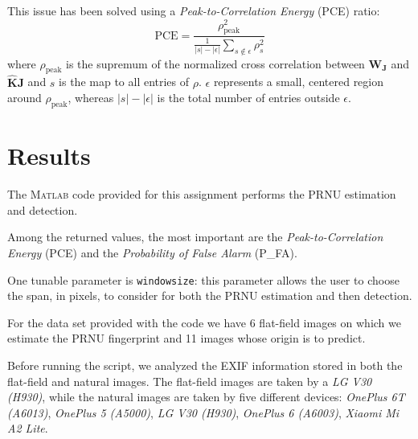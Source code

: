 \documentclass[a4paper, 11pt]{article}
\begin{document}
This issue has been solved using a \textit{Peak-to-Correlation Energy} (PCE) ratio:
\begin{equation}
\text{PCE} = \dfrac{{\rho}^2_{\text{peak}}}{\frac{1}{|s|-|\epsilon|} \sum\limits_{s\notin \epsilon} {\rho}^2_s}
\end{equation}
where ${\rho}_{\text{peak}}$ is the supremum of the normalized cross correlation between $\mathbf{W_J}$ and $\mathbf{\hat{K}J}$ and $s$ is the map to all entries of $\rho$. $\epsilon$ represents a small, centered region around ${\rho}_{\text{peak}}$, whereas $|s|-|\epsilon|$ is the total number of entries outside $\epsilon$.

\section*{Results}
The \textsc{Matlab} code provided for this assignment performs the PRNU estimation and detection.

Among the returned values, the most important are the \textit{Peak-to-Correlation Energy} (PCE) and the \textit{Probability of False Alarm} (P\_FA).

One tunable parameter is \texttt{windowsize}: this parameter allows the user to choose the span, in pixels, to consider for both the PRNU estimation and then detection.

For the data set provided with the code we have 6 flat-field images on which we estimate the PRNU fingerprint and 11 images whose origin is to predict.

Before running the script, we analyzed the EXIF information stored in both the flat-field and natural images. The flat-field images are taken by a \textit{LG V30 (H930)}, while the natural images are taken by five different devices: \textit{OnePlus 6T (A6013)}, \textit{OnePlus 5 (A5000)}, \textit{LG V30 (H930)}, \textit{OnePlus 6 (A6003)}, \textit{Xiaomi Mi A2 Lite}.
\end{document}
